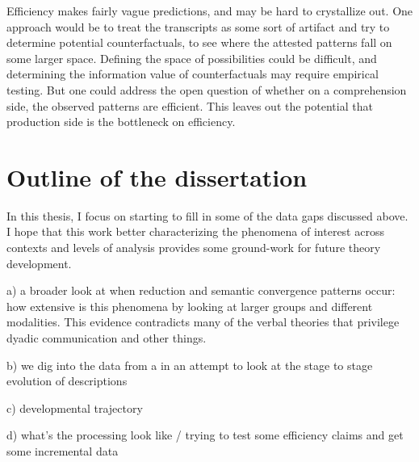 \documentclass[]{article}
\begin{document}
	Efficiency makes fairly vague predictions, and may be hard to crystallize out. One approach would be to treat the transcripts as some sort of artifact and try to determine potential counterfactuals, to see where the attested patterns fall on some larger space. Defining the space of possibilities could be difficult, and determining the information value of counterfactuals may require empirical testing. But one could address the open question of whether on a comprehension side, the observed patterns are efficient. This leaves out the potential that production side is the bottleneck on efficiency.  
	
	
	\section{Outline of the dissertation}
	
	
	
	In this thesis, I focus on starting to fill in some of the data gaps discussed above. I hope that this work better characterizing the phenomena of interest across contexts and levels of analysis provides some ground-work for future theory development. 

	a) a broader look at when reduction and semantic convergence patterns occur: how extensive is this phenomena by looking at larger groups and different modalities. This evidence contradicts many of the verbal theories that privilege dyadic communication and other things. 
	
	b) we dig into the data from a in an attempt to look at the stage to stage evolution of descriptions
	
	c) developmental trajectory
	
	d) what's the processing look like / trying to test some efficiency claims and get some incremental data
	
\end{document}
